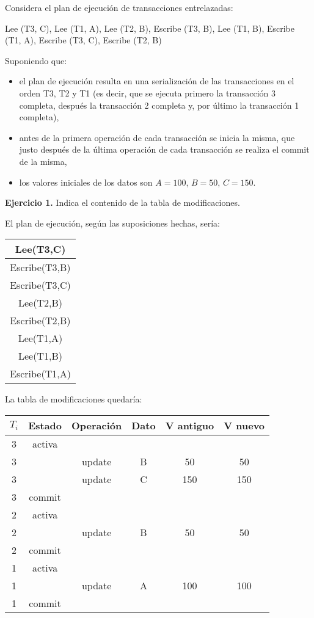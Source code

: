 \documentclass[12pt]{report}
\begin{document}
Considera el plan de ejecución de transacciones entrelazadas:

Lee (T3, C), Lee (T1, A), Lee (T2, B), Escribe (T3, B),
Lee (T1, B), Escribe (T1, A), Escribe (T3, C), Escribe (T2, B)

Suponiendo que:
\begin{itemize}
\item el plan de ejecución resulta en una serialización de las transacciones en el orden T3, T2 y T1
(es decir, que se ejecuta primero la transacción 3 completa, después la transacción 2
completa y, por último la transacción 1 completa), 
\item antes de la primera operación de cada transacción se inicia la misma, que justo después de la última operación de cada transacción se realiza el commit de la misma, 
\item los valores iniciales de los datos son $A=100$, $B=50$, $C=150$.
\end{itemize}

\textbf{Ejercicio 1.} Indica el contenido de la tabla de modificaciones.

El plan de ejecución, según las suposiciones hechas, sería:

\begin{center}
\begin{tabular}{|c|}
\hline 
Lee(T3,C) \\ 
\hline 
Escribe(T3,B) \\ 
\hline 
Escribe(T3,C) \\ 
\hline 
Lee(T2,B) \\ 
\hline 
Escribe(T2,B) \\ 
\hline 
Lee(T1,A) \\ 
\hline 
Lee(T1,B) \\ 
\hline 
Escribe(T1,A) \\ 
\hline 
\end{tabular} 
\end{center}

La tabla de modificaciones quedaría:
\begin{center}
\begin{tabular}{|c|c|c|c|c|c|}
\hline 
$T_i$ & Estado & Operación & Dato & V antiguo & V nuevo \\ 
\hline 
3 & activa &   &   &   &   \\ 
\hline 
3 &   & update & B & 50 & 50 \\ 
\hline 
3 &   & update & C & 150 & 150 \\ 
\hline 
3 & commit &   &   &   &   \\ 
\hline 
2 & activa &   &   &   &   \\ 
\hline 
2 &   & update & B & 50 & 50 \\ 
\hline 
2 & commit &   &   &   &   \\ 
\hline 
1 & activa &   &   &   &   \\ 
\hline 
1 &   & update & A & 100 & 100 \\ 
\hline 
1 & commit &  &  &  &  \\ 
\hline 
\end{tabular} 
\end{center}
\end{document}
